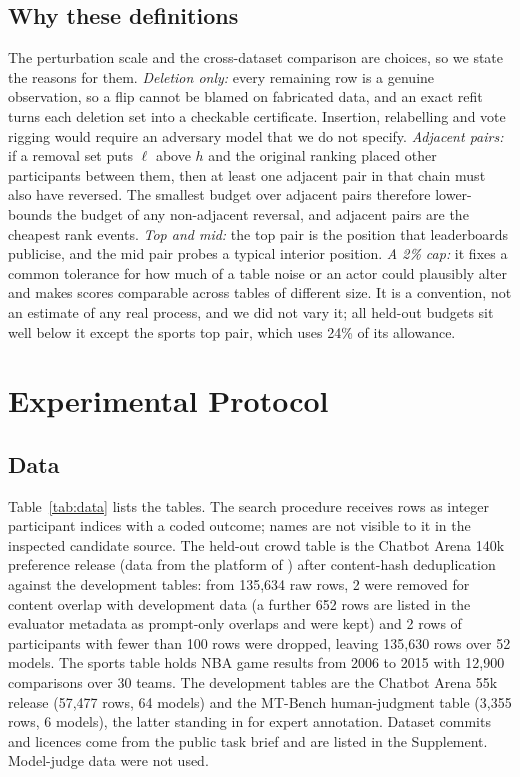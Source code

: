 \documentclass{article}
\newcommand{\hi}{h}
\newcommand{\lo}{\ell}
\begin{document}
\subsection{Why these definitions}
The perturbation scale and the cross-dataset comparison are choices, so we state the reasons for them. \emph{Deletion only:} every remaining row is a genuine observation, so a flip cannot be blamed on fabricated data, and an exact refit turns each deletion set into a checkable certificate. Insertion, relabelling and vote rigging would require an adversary model that we do not specify. \emph{Adjacent pairs:} if a removal set puts $\lo$ above $\hi$ and the original ranking placed other participants between them, then at least one adjacent pair in that chain must also have reversed. The smallest budget over adjacent pairs therefore lower-bounds the budget of any non-adjacent reversal, and adjacent pairs are the cheapest rank events. \emph{Top and mid:} the top pair is the position that leaderboards publicise, and the mid pair probes a typical interior position. \emph{A 2\% cap:} it fixes a common tolerance for how much of a table noise or an actor could plausibly alter and makes scores comparable across tables of different size. It is a convention, not an estimate of any real process, and we did not vary it; all held-out budgets sit well below it except the sports top pair, which uses 24\% of its allowance. %

\section{Experimental Protocol}
\subsection{Data}\label{sec:data}
Table~\ref{tab:data} lists the tables. The search procedure receives rows as integer participant indices with a coded outcome; names are not visible to it in the inspected candidate source. The held-out crowd table is the Chatbot Arena 140k preference release (data from the platform of \citealp{https://doi.org/10.48550/arxiv.2403.04132}) after content-hash deduplication against the development tables: from 135,634 raw rows, 2 were removed for content overlap with development data (a further 652 rows are listed in the evaluator metadata as prompt-only overlaps and were kept) and 2 rows of participants with fewer than 100 rows were dropped, leaving 135,630 rows over 52 models. The sports table holds NBA game results from 2006 to 2015 with 12,900 comparisons over 30 teams. The development tables are the Chatbot Arena 55k release (57,477 rows, 64 models) and the MT-Bench human-judgment table (3,355 rows, 6 models), the latter standing in for expert annotation. Dataset commits and licences come from the public task brief and are listed in the Supplement. Model-judge data were not used.
\end{document}
